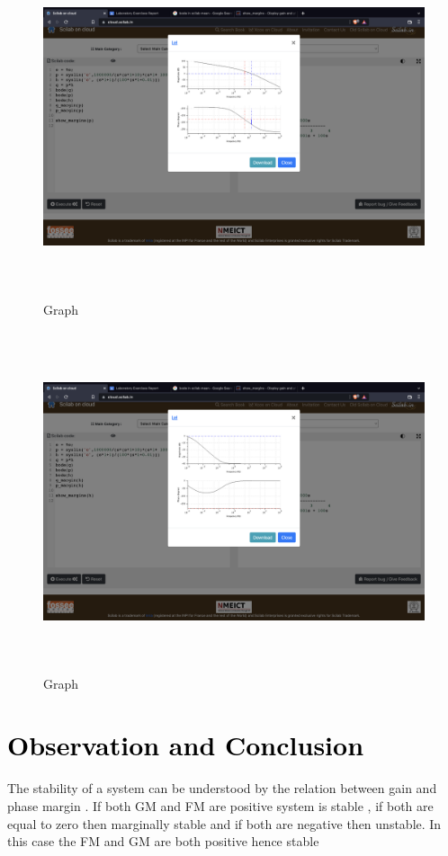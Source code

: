 \documentclass[12pt]{article}
\begin{document}
\begin{figure}[!hth]
        \centering
        \includegraphics[width =20cm, height = 10cm]{images/bode plot.png}
        \caption{Graph}
        \label{Graph}
\end{figure}
\begin{figure}[!hth]
        \centering
        \includegraphics[width =20cm, height = 10cm]{images/bode ans.png}
        \caption{Graph}
        \label{Graph}
\end{figure}

\section*{\textcolor{black}{Observation and Conclusion}}
The stability of a system can be understood by the relation between gain and phase margin . If both GM and FM are positive system is stable , if both are equal to zero then marginally stable and if both are negative then unstable. 
In this case the FM and GM are both positive hence stable
\end{document}
